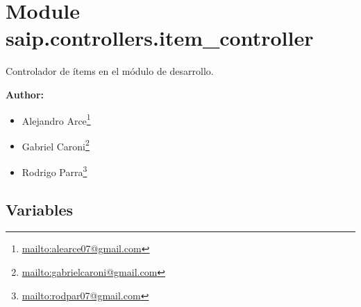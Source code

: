 %
%
%


\section{Module saip.controllers.item\_controller}

    \label{saip:controllers:item_controller}
Controlador de ítems en el módulo de desarrollo.

\textbf{Author:} \begin{itemize}
\setlength{\parskip}{0.6ex}
  \item Alejandro 
    Arce\footnote{\href{mailto:alearce07@gmail.com}{mailto:alearce07@gmail.com}}

  \item Gabriel 
    Caroni\footnote{\href{mailto:gabrielcaroni@gmail.com}{mailto:gabrielcaroni@gmail.com}}

  \item Rodrigo 
    Parra\footnote{\href{mailto:rodpar07@gmail.com}{mailto:rodpar07@gmail.com}}

\end{itemize}





  \subsection{Variables}

